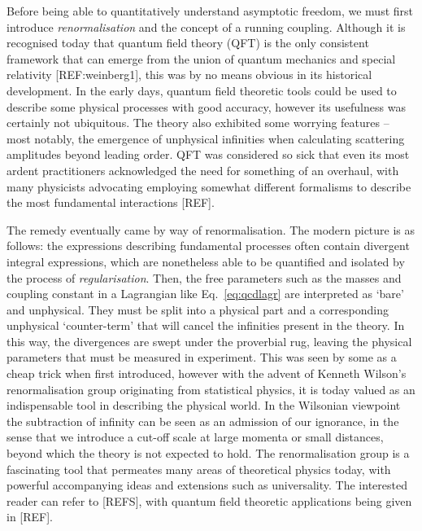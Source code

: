 \documentclass[12pt, a4paper, twoside]{book}
\begin{document}
Before being able to quantitatively understand asymptotic freedom, we must first introduce \emph{renormalisation} and the concept of a running coupling. Although it is recognised today that quantum field theory (QFT) is the only consistent framework that can emerge from the union of quantum mechanics and special relativity [REF:weinberg1], this was by no means obvious in its historical development. In the early days, quantum field theoretic tools could be used to describe some physical processes with good accuracy, however its usefulness was certainly not ubiquitous. The theory also exhibited some worrying features -- most notably, the emergence of unphysical infinities when calculating scattering amplitudes beyond leading order. QFT was considered so sick that even its most ardent practitioners acknowledged the need for something of an overhaul, with many physicists advocating employing somewhat different formalisms to describe the most fundamental interactions [REF].

The remedy eventually came by way of renormalisation. The modern picture is as follows: the expressions describing fundamental processes often contain divergent integral expressions, which are nonetheless able to be quantified and isolated by the process of \emph{regularisation}. Then, the free parameters such as the masses and coupling constant in a Lagrangian like Eq.~\eqref{eq:qcdlagr} are interpreted as `bare' and unphysical. They must be split into a physical part and a corresponding unphysical `counter-term' that will cancel the infinities present in the theory. In this way, the divergences are swept under the proverbial rug, leaving the physical parameters that must be measured in experiment. This was seen by some as a cheap trick when first introduced, however with the advent of Kenneth Wilson's renormalisation group originating from statistical physics, it is today valued as an indispensable tool in describing the physical world. In the Wilsonian viewpoint the subtraction of infinity can be seen as an admission of our ignorance, in the sense that we introduce a cut-off scale at large momenta or small distances, beyond which the theory is not expected to hold. The renormalisation group is a fascinating tool that permeates many areas of theoretical physics today, with powerful accompanying ideas and extensions such as universality. The interested reader can refer to [REFS], with quantum field theoretic applications being given in [REF].
\end{document}
